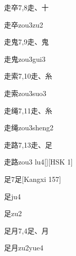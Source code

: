 \begin{entry}{走卒}{7,8}{⾛、⼗}
  \begin{phonetics}{走卒}{zou3zu2}
  \end{phonetics}
\end{entry}

\begin{entry}{走鬼}{7,9}{⾛、⿁}
  \begin{phonetics}{走鬼}{zou3gui3}
  \end{phonetics}
\end{entry}

\begin{entry}{走索}{7,10}{⾛、⽷}
  \begin{phonetics}{走索}{zou3suo3}
  \end{phonetics}
\end{entry}

\begin{entry}{走绳}{7,11}{⾛、⽷}
  \begin{phonetics}{走绳}{zou3sheng2}
  \end{phonetics}
\end{entry}

\begin{entry}{走路}{7,13}{⾛、⾜}
  \begin{phonetics}{走路}{zou3 lu4}[][HSK 1]
  \end{phonetics}
\end{entry}

\begin{entry}{足}{7}{⾜}[Kangxi 157]
  \begin{phonetics}{足}{ju4}
  \end{phonetics}
  \begin{phonetics}{足}{zu2}
  \end{phonetics}
\end{entry}

\begin{entry}{足月}{7,4}{⾜、⽉}
  \begin{phonetics}{足月}{zu2yue4}
  \end{phonetics}
\end{entry}

